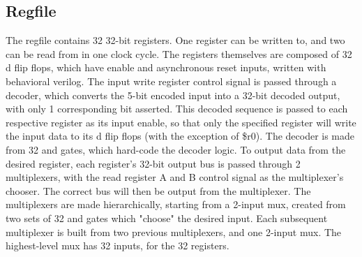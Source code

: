 \documentclass[letterpaper]{article} %
\begin{document}
\subsection*{Regfile}
The regfile contains 32 32-bit registers. One register can be written to, and two can be read from in one clock cycle. The registers themselves are composed of 32 d flip flops, which have enable and asynchronous reset inputs, written with behavioral verilog. The input write register control signal is passed through a decoder, which converts the 5-bit encoded input into a 32-bit decoded output, with only 1 corresponding bit asserted. This decoded sequence is passed to each respective register as its input enable, so that only the specified register will write the input data to its d flip flops (with the exception of \$r0). The decoder is made from 32 and gates, which hard-code the decoder logic. To output data from the desired register, each register's 32-bit output bus is passed through 2 multiplexers, with the read register A and B control signal as the multiplexer's chooser. The correct bus will then be output from the multiplexer. The multiplexers are made hierarchically, starting from a 2-input mux, created from two sets of 32 and gates which "choose" the desired input. Each subsequent multiplexer is built from two previous multiplexers, and one 2-input mux. The highest-level mux has 32 inputs, for the 32 registers. \\
\end{document}

